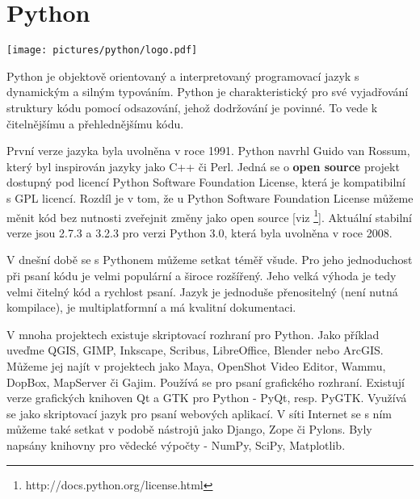 \newpage
\section{Python}
\nocite{py3:book}


\begin{center}
	\texttt{[image: pictures/python/logo.pdf]}
\end{center}

Python je objektově orientovaný a interpretovaný programovací jazyk s
dynamickým a silným typováním. Python je charakteristický pro své
vyjadřování struktury kódu pomocí odsazování, jehož dodržování je
povinné. To vede k čitelnějšímu a přehlednějšímu kódu.

První verze jazyka byla uvolněna v roce 1991. Python navrhl Guido van
Rossum, který byl inspirován jazyky jako C++ či Perl. Jedná se
o \textbf{open source} projekt dostupný pod licencí Python Software
Foundation License, která je kompatibilní s GPL licencí. Rozdíl je v
tom, že u Python Software Foundation License můžeme měnit kód bez
nutnosti zveřejnit změny jako open source
[viz \footnote{http://docs.python.org/license.html}]. Aktuální
stabilní verze jsou 2.7.3 a 3.2.3 pro verzi Python 3.0, která byla
uvolněna v roce 2008.



V dnešní době se s Pythonem můžeme setkat téměř všude. Pro jeho
jednoduchost při psaní kódu je velmi populární a široce
rozšířený. Jeho velká výhoda je tedy velmi čitelný kód a rychlost
psaní.
Jazyk je jednoduše přenositelný (není nutná kompilace), je multiplatformní a má kvalitní dokumentaci. 

V mnoha projektech existuje skriptovací rozhraní pro Python. Jako
příklad uveďme QGIS, GIMP, Inkscape, Scribus, LibreOffice, Blender
nebo ArcGIS. Můžeme jej najít v projektech jako Maya, OpenShot Video
Editor, Wammu, DopBox, MapServer či Gajim. Používá se pro psaní
grafického rozhraní. Existují verze grafických knihoven Qt a GTK pro
Python - PyQt, resp. PyGTK. Využívá se jako skriptovací jazyk pro
psaní webových aplikací. V síti Internet se s ním můžeme také setkat v
podobě nástrojů jako Django, Zope či Pylons. Byly napsány knihovny pro
vědecké výpočty - NumPy, SciPy, Matplotlib.


